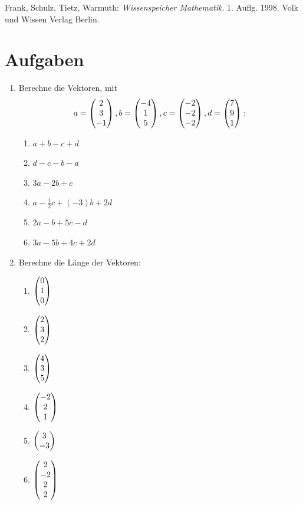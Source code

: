 		Frank, Schulz, Tietz, Warmuth: \textit{Wissenspeicher Mathematik}. 1. Auflg.
		1998. Volk und Wissen Verlag Berlin. 
		
	\section{Aufgaben}
		
		\begin{enumerate}
			\item Berechne die Vektoren, mit \[a = \mvect{2\\3\\-1}, b= \mvect{-4\\1\\5},
			c = \mvect{-2\\-2\\-2}, d = \mvect{7\\9\\1}:\]
				\begin{multicols}{2}
					\begin{enumerate}
					   \item $a+b-c+d$
					   \item $d-c-b-a$
					   \item $3a-2b+c$
					   \item $a-\frac{1}{2}c+(-3)b+2d$
					   \item $2a-b+5c-d$
					   \item $3a-5b+4c+2d$
			  		\end{enumerate}
				\end{multicols}
			\item Berechne die Länge der Vektoren:
			\begin{multicols}{3}
				\begin{enumerate}
				    \item $\left(\!\!\!\begin{array}{c}0\\1\\0 \end{array}\!\!\!\right)$
				    \item $\left(\!\!\!\begin{array}{c}2\\3\\2 \end{array}\!\!\!\right)$
				    \item $\left(\!\!\!\begin{array}{c}4\\3\\5 \end{array}\!\!\!\right)$
				    \item $\left(\!\!\!\begin{array}{c}-2\\2\\1 \end{array}\!\!\!\right)$
				    \item $\left(\!\!\!\begin{array}{c}3\\-3 \end{array}\!\!\!\right)$
				    \item $\left(\!\!\!\begin{array}{c}2\\-2\\2\\2 \end{array}\!\!\!\right)$

\end{enumerate}
\end{multicols}
\end{enumerate}
